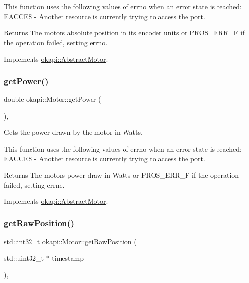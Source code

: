 This function uses the following values of errno when an error state is reached\+: E\+A\+C\+C\+ES -\/ Another resource is currently trying to access the port.

\begin{DoxyReturn}{Returns}
The motor\textquotesingle{}s absolute position in its encoder units or P\+R\+O\+S\+\_\+\+E\+R\+R\+\_\+F if the operation failed, setting errno. 
\end{DoxyReturn}


Implements \mbox{\hyperlink{classokapi_1_1AbstractMotor_a4f9d74e054600c5ddb49ebb8164004d3}{okapi\+::\+Abstract\+Motor}}.

\mbox{\label{classokapi_1_1Motor_a992171c86829e52f5418988fada0b6fa}} 
\subsubsection{\texorpdfstring{getPower()}{getPower()}}
{\footnotesize\ttfamily double okapi\+::\+Motor\+::get\+Power (\begin{DoxyParamCaption}{ }\end{DoxyParamCaption})\hspace{0.3cm}{\ttfamily [override]}, {\ttfamily [virtual]}}

Gets the power drawn by the motor in Watts.

This function uses the following values of errno when an error state is reached\+: E\+A\+C\+C\+ES -\/ Another resource is currently trying to access the port.

\begin{DoxyReturn}{Returns}
The motor\textquotesingle{}s power draw in Watts or P\+R\+O\+S\+\_\+\+E\+R\+R\+\_\+F if the operation failed, setting errno. 
\end{DoxyReturn}


Implements \mbox{\hyperlink{classokapi_1_1AbstractMotor_aed423ac40cec85c5880f7954b6d810fe}{okapi\+::\+Abstract\+Motor}}.

\mbox{\label{classokapi_1_1Motor_a74c579c35863bc5180c9551fd5185d94}} 
\subsubsection{\texorpdfstring{getRawPosition()}{getRawPosition()}}
{\footnotesize\ttfamily std\+::int32\+\_\+t okapi\+::\+Motor\+::get\+Raw\+Position (\begin{DoxyParamCaption}\item[{std\+::uint32\+\_\+t $\ast$}]{timestamp }\end{DoxyParamCaption})\hspace{0.3cm}{\ttfamily [override]}, {\ttfamily [virtual]}}

